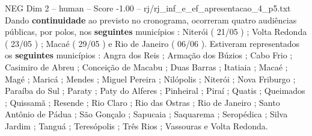 \begin{textsample}{NEG Dim 2 – human – Score -1.00 – rj/rj\_inf\_e\_ef\_apresentacao\_4\_p5.txt}  \label{ex:f2_neg_013}
Dando \textbf{continuidade} ao previsto no cronograma, ocorreram quatro audiências públicas, por polos, nos \textbf{seguintes} municípios : Niterói ( 21/05 ) ; Volta Redonda ( 23/05 ) ; Macaé ( 29/05 ) e Rio de Janeiro ( 06/06 ).
Estiveram representados os \textbf{seguintes} municípios : Angra dos Reis ; Armação dos Búzios ; Cabo Frio ; Casimiro de Abreu ; Conceição de Macabu ; Duas Barras ; Itatiaia ; Macaé ; Magé ; Maricá ; Mendes ; Miguel Pereira ; Nilópolis ; Niterói ; Nova Friburgo ; Paraíba do Sul ; Paraty ; Paty do Alferes ; Pinheiral ; Piraí ; Quatis ; Queimados ; Quissamã ; Resende ; Rio Claro ; Rio das Ostras ; Rio de Janeiro ; Santo Antônio de Pádua ; São Gonçalo ; Sapucaia ; Saquarema ; Seropédica ; Silva Jardim ; Tanguá ; Teresópolis ; Três Rios ; Vassouras e Volta Redonda.

\end{textsample}
